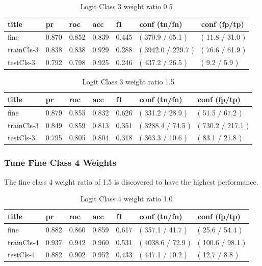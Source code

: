 \documentclass[ms]{nuthesis}
\begin{document}
\FloatBarrier
\begin{table}[H]
\centering
\caption{Logit Class 3 weight ratio 0.5}
\label{tab:LogRegCls3-Wtp5}
\begin{tabular}{|l||l||l||l||l||l||l|}\toprule
title & pr & roc & acc & f1 & conf (tn/fn) & conf (fp/tp) \\ \midrule
fine & 0.870 & 0.852 & 0.839 & 0.445 & ( 370.9 / 65.1 ) & ( 11.8 / 31.0 ) \\
trainCls-3 & 0.838 & 0.838 & 0.929 & 0.288 & ( 3942.0 / 229.7 ) & ( 76.6 / 61.9 ) \\
testCls-3 & 0.792 & 0.798 & 0.925 & 0.246 & ( 437.2 / 26.5 ) & ( 9.2 / 5.9 ) \\ \bottomrule
\end{tabular}
\end{table}
\FloatBarrier

\FloatBarrier
\begin{table}[H]
\centering
\caption{Logit Class 3 weight ratio 1.5}
\label{tab:LogRegCls3-Wt1p5}
\begin{tabular}{|l||l||l||l||l||l||l|}\toprule
title & pr & roc & acc & f1 & conf (tn/fn) & conf (fp/tp) \\ \midrule
fine & 0.879 & 0.855 & 0.832 & 0.626 & ( 331.2 / 28.9 ) & ( 51.5 / 67.2 ) \\
trainCls-3 & 0.849 & 0.859 & 0.813 & 0.351 & ( 3288.4 / 74.5 ) & ( 730.2 / 217.1 ) \\
testCls-3 & 0.795 & 0.805 & 0.804 & 0.318 & ( 363.3 / 10.6 ) & ( 83.1 / 21.8 ) \\ \bottomrule
\end{tabular}
\end{table}
\FloatBarrier


\subsubsection{Tune Fine Class 4 Weights}
\par The fine class 4 weight ratio of 1.5 is discovered to have the highest performance.
\FloatBarrier
\begin{table}[H]
\centering
\caption{Logit Class 4 weight ratio 1.0}
\label{tab:LogRegCls4-Wt1}
\begin{tabular}{|l||l||l||l||l||l||l|}\toprule
title & pr & roc & acc & f1 & conf (tn/fn) & conf (fp/tp) \\ \midrule
fine & 0.882 & 0.860 & 0.859 & 0.617 & ( 357.1 / 41.7 ) & ( 25.6 / 54.4 ) \\
trainCls-4 & 0.937 & 0.942 & 0.960 & 0.531 & ( 4038.6 / 72.9 ) & ( 100.6 / 98.1 ) \\
testCls-4 & 0.882 & 0.902 & 0.952 & 0.433 & ( 447.1 / 10.2 ) & ( 12.7 / 8.8 ) \\ \bottomrule
\end{tabular}
\end{table}
\FloatBarrier
\end{document}
